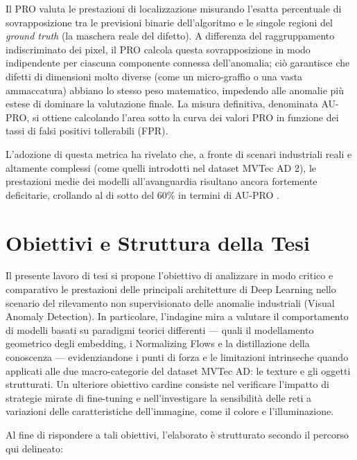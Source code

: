 \begin{itemize}
    Il PRO valuta le prestazioni di localizzazione misurando l'esatta percentuale di sovrapposizione tra le previsioni binarie dell'algoritmo e le singole regioni del \textit{ground truth} (la maschera reale del difetto). \cite{Zheng_et_al._2022} A differenza del raggruppamento indiscriminato dei pixel, il PRO calcola questa sovrapposizione in modo indipendente per ciascuna componente connessa dell'anomalia; ciò garantisce che difetti di dimensioni molto diverse (come un micro-graffio o una vasta ammaccatura) abbiano lo stesso peso matematico, impedendo alle anomalie più estese di dominare la valutazione finale. \cite{Zheng_et_al._2022} La misura definitiva, denominata AU-PRO, si ottiene calcolando l'area sotto la curva dei valori PRO in funzione dei tassi di falsi positivi tollerabili (FPR). \cite{Zheng_et_al._2022} 
    
    L'adozione di questa metrica ha rivelato che, a fronte di scenari industriali reali e altamente complessi (come quelli introdotti nel dataset MVTec AD 2), le prestazioni medie dei modelli all'avanguardia risultano ancora fortemente deficitarie, crollando al di sotto del 60\% in termini di AU-PRO \cite{Steger_et_al._2026}.
\end{itemize}

\section{Obiettivi e Struttura della Tesi}

Il presente lavoro di tesi si propone l'obiettivo di analizzare in modo critico e comparativo le prestazioni delle principali architetture di Deep Learning nello scenario del rilevamento non supervisionato delle anomalie industriali (Visual Anomaly Detection). In particolare, l'indagine mira a valutare il comportamento di modelli basati su paradigmi teorici differenti — quali il modellamento geometrico degli embedding, i Normalizing Flows e la distillazione della conoscenza — evidenziandone i punti di forza e le limitazioni intrinseche quando applicati alle due macro-categorie del dataset MVTec AD: le texture e gli oggetti strutturati. Un ulteriore obiettivo cardine consiste nel verificare l'impatto di strategie mirate di fine-tuning e nell'investigare la sensibilità delle reti a variazioni delle caratteristiche dell'immagine, come il colore e l'illuminazione.

Al fine di rispondere a tali obiettivi, l'elaborato è strutturato secondo il percorso qui delineato:

